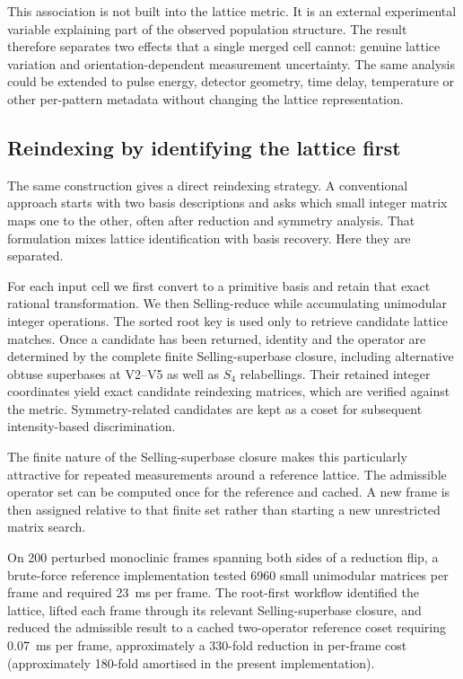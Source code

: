 \documentclass[11pt]{article}
\begin{document}
This association is not built into the lattice metric. It is an external experimental variable explaining part of the observed population structure. The result therefore separates two effects that a single merged cell cannot: genuine lattice variation and orientation-dependent measurement uncertainty. The same analysis could be extended to pulse energy, detector geometry, time delay, temperature or other per-pattern metadata without changing the lattice representation.


\subsection{Reindexing by identifying the lattice first}

The same construction gives a direct reindexing strategy. A conventional approach starts with two basis descriptions and asks which small integer matrix maps one to the other, often after reduction and symmetry analysis. That formulation mixes lattice identification with basis recovery. Here they are separated.

For each input cell we first convert to a primitive basis and retain that exact rational transformation. We then Selling-reduce while accumulating unimodular integer operations. The sorted root key is used only to retrieve candidate lattice matches. Once a candidate has been returned, identity and the operator are determined by the complete finite Selling-superbase closure, including alternative obtuse superbases at V2--V5 as well as $S_4$ relabellings. Their retained integer coordinates yield exact candidate reindexing matrices, which are verified against the metric. Symmetry-related candidates are kept as a coset for subsequent intensity-based discrimination.

The finite nature of the Selling-superbase closure makes this particularly attractive for repeated measurements around a reference lattice. The admissible operator set can be computed once for the reference and cached. A new frame is then assigned relative to that finite set rather than starting a new unrestricted matrix search.

On 200 perturbed monoclinic frames spanning both sides of a reduction flip, a brute-force reference implementation tested 6960 small unimodular matrices per frame and required \SI{23}{\milli\second} per frame. The root-first workflow identified the lattice, lifted each frame through its relevant Selling-superbase closure, and reduced the admissible result to a cached two-operator reference coset requiring \SI{0.07}{\milli\second} per frame, approximately a 330-fold reduction in per-frame cost (approximately 180-fold amortised in the present implementation).
\end{document}
